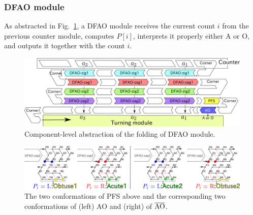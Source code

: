 			\subsubsection{DFAO module}


As abstracted in Fig.~\ref{fig:abst_dfao}, a DFAO module receives the current count $i$ from the previous counter module, computes $P[i]$, interprets it properly either A or O, and outputs it together with the count $i$. 

\begin{figure}[h]
\includegraphics[width=\linewidth]{pic/abst_DFAO.png}
\caption{Component-level abstraction of the folding of DFAO module.}
\label{fig:abst_dfao}
\end{figure}


\begin{figure}[h]
\includegraphics[width=\linewidth]{pic/PFS.png}
\caption{The two conformations of PFS above and the corresponding two conformations of (left) AO and (right) of $\overline{\rm AO}$.}
\label{fig:PFS}
\end{figure}


